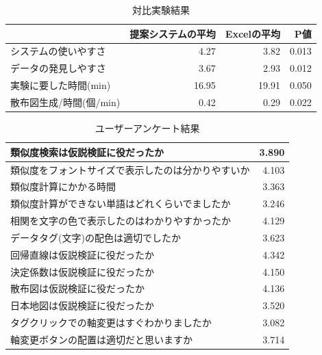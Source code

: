 \documentclass[sotsuron]{kuee}
\begin{document}
\appendix

\begin{table}
  \caption{対比実験結果}\label{5-1}
  \begin{center}
    \begin{tabular}{|l|r|r|r|} \hline
       & 提案システムの平均 & Excelの平均 & P値 \\  \hline
     システムの使いやすさ & 4.27 & 3.82 & 0.013 \\  \hline
     データの発見しやすさ & 3.67 & 2.93 & 0.012 \\  \hline
     実験に要した時間(min) & 16.95 & 19.91 & 0.050 \\  \hline
     散布図生成/時間(個/min) & 0.42& 0.29 & 0.022 \\  \hline
    \end{tabular}
  \end{center}
\end{table}

\begin{table}
  \caption{ユーザーアンケート結果}\label{5-3}
  \begin{center}
    \begin{tabular}{|l|r|} \hline
      類似度検索は仮説検証に役だったか & 3.890 \\  \hline
      類似度をフォントサイズで表示したのは分かりやすいか & 4.103 \\  \hline
      類似度計算にかかる時間 & 3.363 \\  \hline
      類似度計算ができない単語はどれくらいでましたか & 3.246 \\  \hline
      相関を文字の色で表示したのはわかりやすかったか & 4.129 \\ \hline
      データタグ(文字)の配色は適切でしたか & 3.623 \\ \hline
      回帰直線は仮説検証に役だったか & 4.342 \\ \hline
      決定係数は仮説検証に役だったか & 4.150 \\ \hline
      散布図は仮説検証に役だったか & 4.136 \\ \hline
      日本地図は仮説検証に役だったか & 3.520 \\ \hline
      タグクリックでの軸変更はすぐわかりましたか & 3.082 \\ \hline
      軸変更ボタンの配置は適切だと思いますか & 3.714 \\ \hline
    \end{tabular}
  \end{center}
\end{table}
\end{document}
